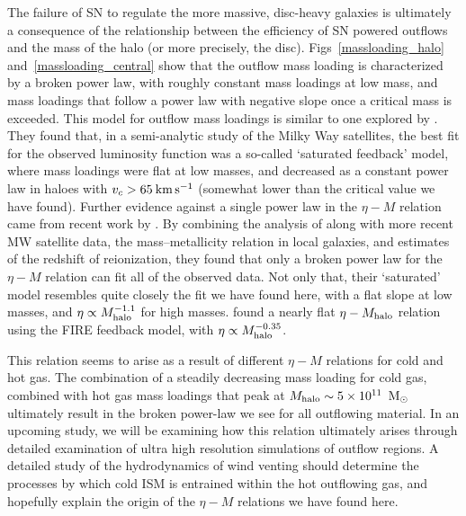The failure of SN to regulate the more massive, disc-heavy galaxies is
ultimately a consequence of the relationship between the efficiency of SN
powered outflows and the mass of the halo (or more precisely, the disc).
Figs~\ref{massloading_halo} and~\ref{massloading_central} show that the
outflow mass loading is characterized by a broken power law, with roughly
constant mass loadings at low mass, and mass loadings that follow a power law
with negative slope once a critical mass is exceeded.  This model for outflow
mass loadings is similar to one explored by \citet{Font2011}.  They found that,
in a semi-analytic study of the Milky Way satellites, the best fit for the
observed luminosity function was a so-called `saturated feedback' model, where
mass loadings were flat at low masses, and decreased as a constant power law in
haloes with $v_c>65\>{\rm km}\,{\rm s}^{-1}$ (somewhat lower than the critical value we have
found).  Further evidence against a single power law in the $\eta-M$ relation
came from recent work by \citet{Hou2015}.  By combining the analysis of
\citet{Font2011} along with more recent MW satellite data, the mass--metallicity
relation in local galaxies, and estimates of the redshift of reionization, they
found that only a broken power law for the $\eta-M$ relation can fit all of the
observed data.  Not only that, their `saturated' model resembles quite closely
the fit we have found here, with a flat slope at low masses, and $\eta\propto
M_{\rm halo}^{-1.1}$ for high masses.
\citep{Muratov2015} found a nearly flat $\eta-M_{\rm halo}$ relation
using the FIRE feedback model, with $\eta\propto M_{\rm halo}^{-0.35}$.

This relation seems to arise as a result of different $\eta-M$ relations for
cold and hot gas.  The combination of a steadily decreasing mass loading for
cold gas, combined with hot gas mass loadings that peak at
$M_{\rm halo}\sim5\times10^{11}\;\>{\rm M_{\odot}}$ ultimately result in the broken power-law
we see for all outflowing material.  In an upcoming study, we will be examining
how this relation ultimately arises through detailed examination of ultra high
resolution simulations of outflow regions.  A detailed study of the
hydrodynamics of wind venting should determine the processes by which cold ISM
is entrained within the hot outflowing gas, and hopefully explain the origin of
the $\eta-M$ relations we have found here.

